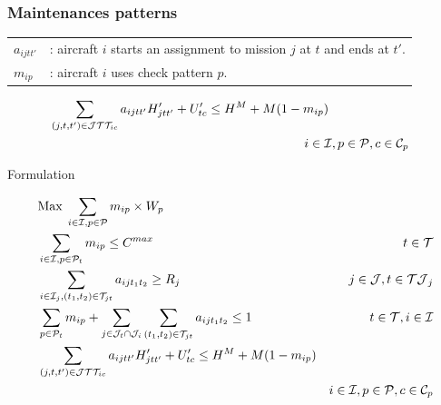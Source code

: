 \begin{frame}
\frametitle{\textbf{Maintenances patterns}}

  \begin{tabular}{p{5mm}p{90mm}}
    $a_{ijtt'}$ & : aircraft $i$ starts an assignment to mission $j$ at $t$ and ends at $t'$.  \\
    $m_{ip}$ &: aircraft $i$ uses check pattern $p$. \\
  \end{tabular}

  

  \begin{align}
    & \sum_{(j, t, t') \in \mathcal{J}\mathcal{T}\mathcal{T}_{ic}} a_{ijtt'} H^\prime_{jtt'} + U^{\prime}_{tc} \leq H^{M} + M (1 - m_{ip}) & \notag \\
    & \hspace{200px}  i \in \mathcal{I}, p \in \mathcal{P}, c \in \mathcal{C}_p \label{eq:cycle_hours2} \notag
  \end{align}

\end{frame}

\begin{frame}

  \begin{block}{Formulation}

  \begin{align}
    & \text{Max}\;
    \sum_{i \in \mathcal{I}, p \in \mathcal{P}} m_{ip} \times W_p \\
    & \sum_{i \in \mathcal{I}, p \in \mathcal{P}_{t}} m_{ip} \leq C^{max} 
            & t \in \mathcal{T} \label{eq:capacity1}\\
    & \sum_{i \in \mathcal{I}_j, (t_1, t_2) \in \mathcal{T}_{jt}} a_{ijt_1t_2} \geq R_j
            & j \in \mathcal{J}, t \in \mathcal{TJ}_j  \label{eq:missionres}\\
    & \sum_{p \in \mathcal{P}_{t}} m_{ip} + \sum_{j \in \mathcal{J}_t \cap \mathcal{J}_i} \sum_{(t_1, t_2) \in \mathcal{T}_{jt}} a_{ijt_1t_2} \leq 1 
            & t \in \mathcal{T}, i \in \mathcal{I} \label{eq:state}\\
    & \sum_{(j, t, t') \in \mathcal{J}\mathcal{T}\mathcal{T}_{ic}} a_{ijtt'} H^\prime_{jtt'} + U^{\prime}_{tc} \leq H^M + M (1 - m_{ip}) & \notag \\
      & & i \in \mathcal{I}, p \in \mathcal{P}, c \in \mathcal{C}_p \\
  \end{align}

  \end{block}

\end{frame}

